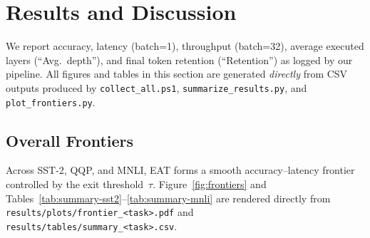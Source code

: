 \documentclass[11pt,letterpaper]{article}
\theoremstyle{plain}
\newcommand{\eat}{\textsc{EAT}}
\begin{document}

\section{Results and Discussion}
We report accuracy, latency (batch{=}1), throughput (batch{=}32), average executed layers (``Avg.\ depth''), and final token retention (``Retention'') as logged by our pipeline.
All figures and tables in this section are generated \emph{directly} from CSV outputs produced by
\texttt{collect\_all.ps1}, \texttt{summarize\_results.py}, and \texttt{plot\_frontiers.py}.

\subsection{Overall Frontiers}
\label{sec:frontiers}
Across SST-2, QQP, and MNLI, \eat{} forms a smooth accuracy--latency frontier controlled by the exit threshold~$\tau$.
Figure~\ref{fig:frontiers} and Tables~\ref{tab:summary-sst2}--\ref{tab:summary-mnli} are rendered directly from
\texttt{results/plots/frontier\_<task>.pdf} and \texttt{results/tables/summary\_<task>.csv}.
\end{document}
